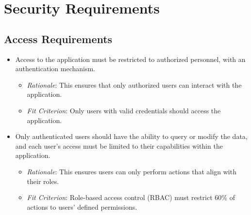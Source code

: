 \documentclass[12pt]{article}
\begin{document}
\section{Security Requirements}

\subsection{Access Requirements}
\begin{itemize}
    \item Access to the application must be restricted to authorized personnel,
    with an authentication mechanism.
    \begin{itemize}
        \item \textit{Rationale}: This ensures that only authorized users can
        interact with the application.
        \item \textit{Fit Criterion}: Only users with valid credentials should
        access the application.
    \end{itemize}
    
    \item Only authenticated users should have the ability to query or modify
    the data, and each user’s access must be limited to their capabilities
    within the application.
    \begin{itemize}
        \item \textit{Rationale}: This ensures users can only perform actions
        that align with their roles.
        \item \textit{Fit Criterion}: Role-based access control (RBAC) must
        restrict 60\% of actions to users’ defined permissions.
    \end{itemize}
\end{itemize}
\end{document}
